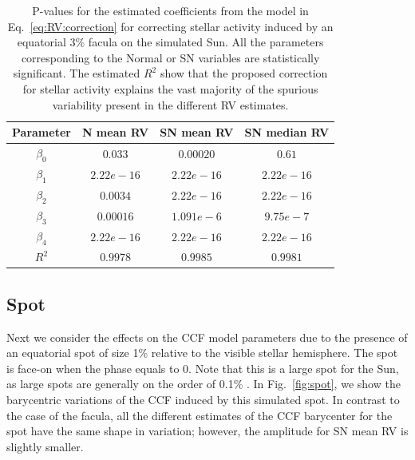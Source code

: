 \documentclass{aa}
\begin{document}
\begin{table}
\begin{center}
\caption{P-values for the estimated coefficients from the model in Eq.~\eqref{eq:RV:correction} for correcting stellar activity induced by an equatorial 3\% facula on the simulated Sun. All the parameters corresponding to the Normal or SN variables are statistically significant. The estimated $R^{2}$ show that the proposed correction for stellar activity explains the vast majority of the spurious variability present in the different RV estimates.}
\label{table:faculae.test}
\begin{tabular}{|c|c|c|c|}
\hline
Parameter          & N mean RV         &   SN mean RV &   SN median RV \\
\hline
$\beta_{0}$            &    $0.033$    & $0.00020$ & $0.61$ \\
\hline
$\beta_{1}$            &    $2.22e-16 $    & $2.22e-16 $ & $2.22e-16 $ \\
\hline
$\beta_{2}$            &     $0.0034$   &  $2.22e-16 $ & $2.22e-16 $\\
\hline
$\beta_{3}$            &     $0.00016$   &  $1.091e-6$ & $9.75e-7$\\
\hline
$\beta_{4}$            &     $2.22e-16$   &  $2.22e-16$ & $2.22e-16$\\
\hline
$R^{2}$      &     $0.9978$    &  $0.9985$ & $0.9981$  \\
\hline
\end{tabular}
\end{center}
\end{table}










\subsection{Spot} \label{sec:soap.spot}

Next we consider the effects on the CCF model parameters due to the presence of an equatorial spot of size 1\% relative to the visible stellar hemisphere. 
The spot is face-on when the phase equals to 0. 
Note that this is a large spot for the Sun, as large spots are generally on the order of 0.1\% \citep[e.g.][]{Borgniet-2015}. 
In Fig.~\ref{fig:spot}, we show the barycentric variations of the CCF induced by this simulated spot. 
In contrast to the case of the facula, all the different estimates of the CCF barycenter for the spot have the same shape in variation; however, the amplitude for SN mean RV is slightly smaller.
\end{document}

